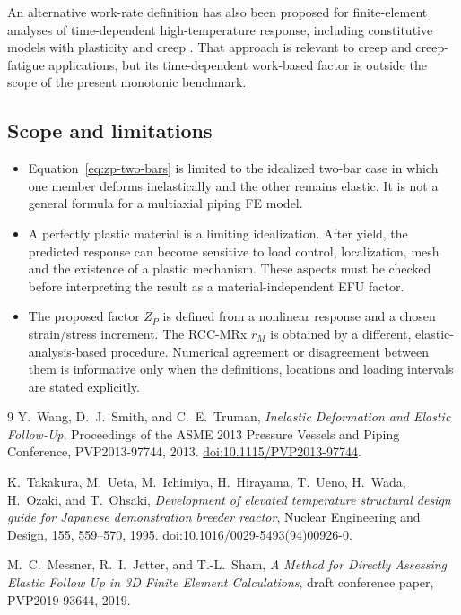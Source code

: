 \documentclass[11pt,a4paper]{article}
\begin{document}
An alternative work-rate definition has also been proposed for finite-element analyses of time-dependent high-temperature response, including constitutive models with plasticity and creep \cite{Messner2019}. That approach is relevant to creep and creep-fatigue applications, but its time-dependent work-based factor is outside the scope of the present monotonic benchmark.

\subsection*{Scope and limitations}

\begin{itemize}[leftmargin=1.5em]
\item Equation~\eqref{eq:zp-two-bars} is limited to the idealized two-bar case in which one member deforms inelastically and the other remains elastic. It is not a general formula for a multiaxial piping FE model.
\item A perfectly plastic material is a limiting idealization. After yield, the predicted response can become sensitive to load control, localization, mesh and the existence of a plastic mechanism. These aspects must be checked before interpreting the result as a material-independent EFU factor.
\item The proposed factor $Z_P$ is defined from a nonlinear response and a chosen strain/stress increment. The RCC-MRx $r_M$ is obtained by a different, elastic-analysis-based procedure. Numerical agreement or disagreement between them is informative only when the definitions, locations and loading intervals are stated explicitly.
\end{itemize}

\begin{thebibliography}{9}
Y.~Wang, D.~J.~Smith, and C.~E.~Truman,
\emph{Inelastic Deformation and Elastic Follow-Up},
Proceedings of the ASME 2013 Pressure Vessels and Piping Conference,
PVP2013-97744, 2013.
\href{https://doi.org/10.1115/PVP2013-97744}{doi:10.1115/PVP2013-97744}.

K.~Takakura, M.~Ueta, M.~Ichimiya, H.~Hirayama, T.~Ueno, H.~Wada,
H.~Ozaki, and T.~Ohsaki,
\emph{Development of elevated temperature structural design guide for
Japanese demonstration breeder reactor},
Nuclear Engineering and Design, 155, 559--570, 1995.
\href{https://doi.org/10.1016/0029-5493(94)00926-0}
{doi:10.1016/0029-5493(94)00926-0}.

M.~C.~Messner, R.~I.~Jetter, and T.-L.~Sham,
\emph{A Method for Directly Assessing Elastic Follow Up in 3D Finite
Element Calculations}, draft conference paper, PVP2019-93644, 2019.
\end{thebibliography}
\end{document}
